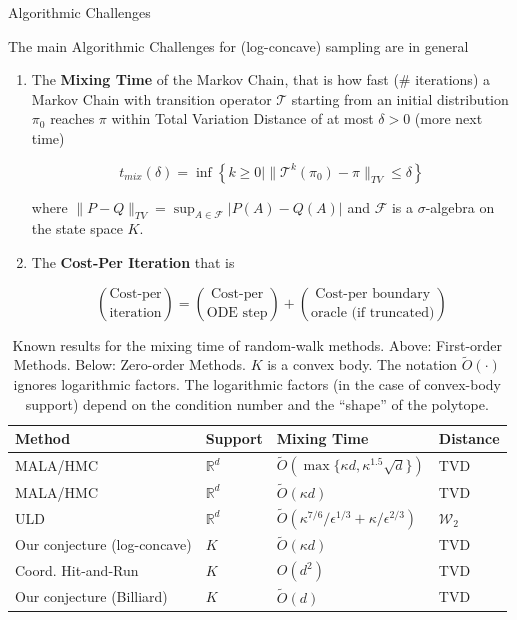 \documentclass[10pt]{beamer}
\begin{document}
\begin{frame}[allowframebreaks]{Algorithmic Challenges}

The main Algorithmic Challenges for (log-concave) sampling are in general

\begin{enumerate}
    \item The \textbf{Mixing Time} of the Markov Chain, that is how fast (\# iterations) a Markov Chain with transition operator $\mathcal T$ starting from an initial distribution $\pi_0$ reaches $\pi$ within Total Variation Distance of at most $\delta > 0$ (more next time)
    
    $$t_{mix}(\delta) = \inf \left \{ k \ge 0 | \| \mathcal T^k (\pi_0) - \pi \|_{TV} \le \delta \right \}$$
    
    where $\| P - Q \|_{TV} = \sup_{A \in \mathcal F} |P(A) - Q(A)|$ and $\mathcal F$ is a $\sigma$-algebra on the state space $K$. 
    
    \item The \textbf{Cost-Per Iteration} that is 
    
    $$\binom {\text {Cost-per}} {\text{iteration}} = \binom {\text {Cost-per}} {\text{ODE step}} + \binom {\text {Cost-per boundary}} {\text{oracle (if truncated)}}$$

    \end{enumerate}


    \framebreak
    
        
    \begin{table}
        \centering
        \begin{tabu} to \textwidth {X[3] X X[3] X}
        \toprule
            Method & Support & Mixing Time & Distance \\
        \midrule
            MALA/HMC \cite{dwivedi2019log} & $\mathbb R^d$ &  $\tilde O(\max \{ \kappa d, \kappa^{1.5} \sqrt d \})$ & TVD \\
            MALA/HMC \cite{lee2020logsmooth} & $\mathbb R^d$ & $\tilde O(\kappa d)$ & TVD \\
            ULD \cite{shen2019randomized} & $\mathbb R^d$ & $\tilde O(\kappa^{7/6} / \epsilon^{1/3} + \kappa / \epsilon^{2/3}) $ & $\mathcal W_2$ \\
            Our conjecture (log-concave) & $K$  & $\tilde O(\kappa d)$ & TVD \\
            \midrule 
            Coord. Hit-and-Run \cite{haraldsdottir2017chrr} &  $K$ & $O(d^2)$ & TVD \\
            Our conjecture (Billiard) & $K$ & $\tilde O(d)$ & TVD \\
        \bottomrule
        \end{tabu}
        \caption{Known results for the mixing time of random-walk methods. Above: First-order Methods. Below: Zero-order Methods. $K$ is a convex body. The notation $\tilde O(\cdot)$ ignores logarithmic factors. The logarithmic factors (in the case of convex-body support) depend on the condition number and the ``shape'' of the polytope.}
        \label{table:methods}
    \end{table}


\end{frame}
\end{document}
